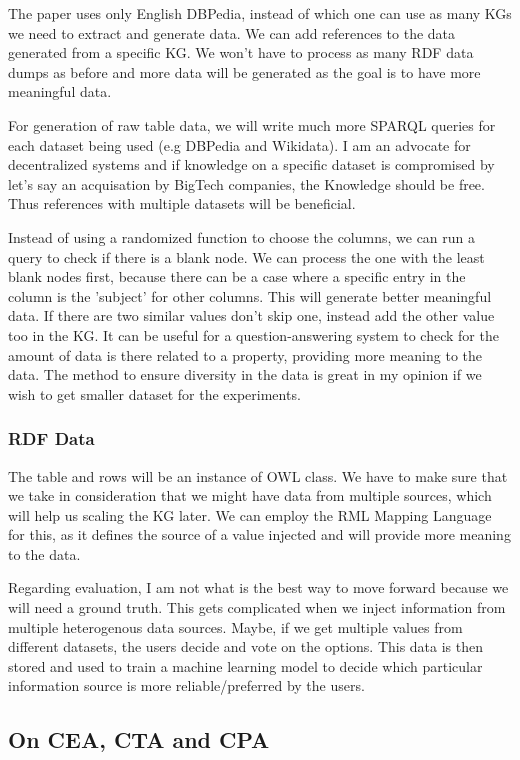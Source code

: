 \documentclass[runningheads]{llncs}
\begin{document}
The paper uses only English DBPedia, instead of which one can use as many KGs we need to extract and generate data. We can add references to the data generated
from a specific KG. We won't have to process as many RDF data dumps as before and more data will be generated as the goal is to have more meaningful
data.

For generation of raw table data, we will write much more SPARQL queries for each dataset being used (e.g DBPedia and Wikidata). I am an advocate for 
decentralized systems and if knowledge on a specific dataset is compromised by let's say an acquisation by BigTech companies, the Knowledge should be free.
Thus references with multiple datasets will be beneficial.

Instead of using a randomized function to choose the columns, we can run a query to check if there is a blank node. We can process the one with the least blank nodes first,
because there can be a case where a specific entry in the column is the 'subject' for other columns. This will generate better meaningful data.
If there are two similar values don't skip one, instead add the other value too in the KG. It can be useful for a question-answering system to 
check for the amount of data is there related to a property, providing more meaning to the data. The method to ensure diversity in the data is great in my opinion if we wish to get smaller dataset for the experiments.

\subsubsection*{RDF Data}
The table and rows will be an instance of OWL class. We have to make sure that we take in consideration that we might have data from multiple sources,
which will help us scaling the KG later. We can employ the RML Mapping Language for this, as it defines the source of a value injected and will
provide more meaning to the data.

Regarding evaluation, I am not what is the best way to move forward because we will need a ground truth. This gets complicated when we inject information from multiple heterogenous data sources.
Maybe, if we get multiple values from different datasets, the users decide and vote on the options. This data is then stored and used to train a 
machine learning model to decide which particular information source is more reliable/preferred by the users.

\subsection{On CEA, CTA and CPA}
\end{document}
